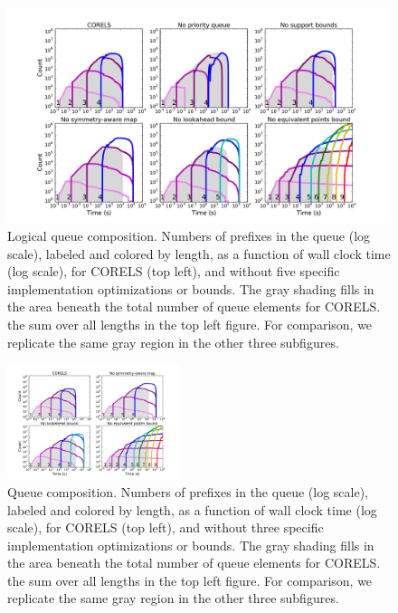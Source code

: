 \begin{arxiv}
\begin{figure}[t!]
\begin{center}
\includegraphics[trim={30mm 10mm 35mm 30mm},
width=\textwidth]{../figs/kdd_compas_ablation-queue.pdf}
\end{center}
\caption{Logical queue composition.
%
Numbers of prefixes in the queue (log scale), labeled and colored by length,
as a function of wall clock time (log scale), for CORELS (top left),
and without five specific implementation optimizations or bounds.
%
The gray shading fills in the area beneath the total number of
queue elements for CORELS.
\ie the sum over all lengths in the top left figure.
%
For comparison, we replicate the same gray region
in the other three subfigures.
}
\label{fig:queue}
\end{figure}
\end{arxiv}
\begin{kdd}
\begin{figure}[t!]
\begin{center}
\includegraphics[trim={30mm 15mm 35mm 30mm},
width=0.45\textwidth]{figs/kdd_compas_ablation_small-queue.pdf}
\end{center}
\caption{Queue composition.
%
Numbers of prefixes in the queue (log scale), labeled and colored by length,
as a function of wall clock time (log scale), for CORELS (top left),
and without three specific implementation optimizations or bounds.
%
The gray shading fills in the area beneath the total number of
queue elements for CORELS.
\ie the sum over all lengths in the top left figure.
%
For comparison, we replicate the same gray region
in the other three subfigures.
}
\label{fig:queue}
\end{figure}
\end{kdd}

